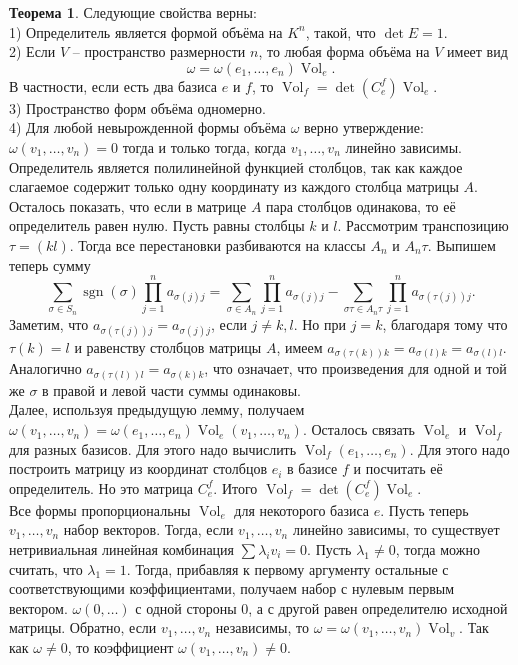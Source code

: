 \documentclass[10pt,a4paper,oneside]{book} %
\theoremstyle{definition}
\newtheorem{thm}{Теорема}
\newcommand{\Vol}{\operatorname{Vol}}
\newcommand{\sgn}{\operatorname{sgn}}
\begin{document}
\begin{thm} Следующие свойства верны:\\
1) Определитель является формой объёма на $K^n$, такой, что $\det E=1$.\\
2) Если $V$ -- пространство размерности $n$, то любая форма объёма на $V$ имеет вид $$\omega=\omega(e_1,\dots,e_n)\Vol_e.$$
В частности, если есть два базиса $e$ и $f$, то $\Vol_{f}=\det(C^f_{e}) \Vol_{e}$.\\
3) Пространство форм объёма одномерно.\\
4) Для любой невырожденной формы объёма $\omega$ верно утверждение: $\omega(v_1,\dots,v_n)=0$ тогда и только тогда, когда $v_1,\dots,v_n$ линейно зависимы.
\proof Определитель является полилинейной функцией столбцов, так как  каждое слагаемое содержит только одну координату из каждого столбца матрицы $A$. Осталось показать, что если в матрице $A$ пара столбцов одинакова, то её определитель равен нулю.
Пусть равны столбцы $k$ и $l$. Рассмотрим транспозицию $\tau=(kl)$. Тогда все перестановки разбиваются на классы $A_n$ и $A_n\tau$. Выпишем теперь сумму
$$\sum_{\sigma \in S_n} \sgn(\sigma)\prod_{j=1}^n a_{\sigma(j)j} = \sum_{\sigma \in A_n} \prod_{j=1}^n a_{\sigma(j)j}- \sum_{\sigma\tau \in A_n\tau} \prod_{j=1}^n a_{\sigma(\tau(j))j}.$$
Заметим, что $a_{\sigma(\tau(j))j}=a_{\sigma(j)j}$, если $j\neq k,l$. Но при  $j=k$, благодаря тому что $\tau(k)=l$  и равенству столбцов матрицы $A$, имеем $a_{\sigma(\tau(k))k}=a_{\sigma(l)k}=a_{\sigma(l)l}$. Аналогично $a_{\sigma(\tau(l))l}=a_{\sigma(k)k}$, что означает, что произведения для одной и той же $\sigma$ в правой и левой части суммы одинаковы.\\

Далее, используя предыдущую лемму, получаем $\omega(v_1,\dots,v_n)=\omega(e_1,\dots,e_n)\Vol_e(v_1,\dots,v_n)$. Осталось связать $\Vol_e$ и $\Vol_f$ для разных базисов. Для этого надо вычислить $\Vol_f(e_1,\dots,e_n)$. Для этого надо построить матрицу из координат столбцов $e_i$ в базисе $f$ и посчитать её определитель. Но это матрица $C_{e}^f$. Итого $\Vol_{f}=\det(C^f_{e}) \Vol_{e}$. \\
Все формы пропорциональны $\Vol_e$ для некоторого базиса $e$.
Пусть теперь $v_1,\dots,v_n$ набор векторов. Тогда, если $v_1,\dots,v_n$ линейно зависимы, то существует нетривиальная линейная комбинация $\sum \lambda_i v_i=0$. Пусть $\lambda_1\neq 0$, тогда можно считать, что $\lambda_1=1$. Тогда, прибавляя к первому аргументу остальные с соответствующими коэффициентами, получаем набор с нулевым первым вектором. $\omega(0,\dots)$ с одной стороны 0, а с другой равен определителю исходной матрицы.
Обратно, если $v_1,\dots,v_n$ независимы, то $\omega=\omega(v_1,\dots,v_n)\Vol_v$. Так как $\omega \neq 0$, то коэффициент $\omega(v_1, \dots,v_n)\neq 0$.
\endproof
\end{thm}
\end{document}
